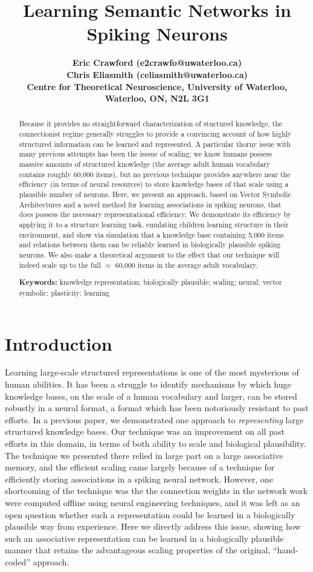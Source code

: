 \documentclass[10pt,letterpaper]{article}
\title{Learning Semantic Networks in Spiking Neurons}
\author{\large \bf Eric Crawford (e2crawfo@uwaterloo.ca)\\
  \large \bf Chris Eliasmith (celiasmith@uwaterloo.ca)\\
  Centre for Theoretical Neuroscience, University of Waterloo,
  Waterloo, ON, N2L 3G1}
\begin{document}

\maketitle

\begin{abstract}
Because it provides no straightforward characterization of stuctured knowledge, the connectionist regime generally struggles to provide a convincing account of how highly structured information can be learned and represented. A particular thorny issue with many previous attempts has been the isssue of scaling; we know humans possess massive amounts of structured knowledge (the average adult human vocabulary contains roughly 60,000 items), but no previous technique provides anywhere near the efficiency (in terms of neural resources) to store knowledge bases of that scale using a plausible number of neurons. Here, we present an approach, based on Vector Symbolic Architectures and a novel method for learning associations in spiking neurons, that does possess the necessary representational efficiency. We demonstrate its efficiency by applying it to a structure learning task, emulating children learning structure in their environment, and show via simulation that a knowledge base containing 5,000 items and relations between them can be reliably learned in biologically plausible spiking neurons. We also make a theoretical argument to the effect that our technique will indeed scale up to the full $\approx$ 60,000 items in the average adult vocabulary.

\textbf{Keywords:} 
knowledge representation; biologically plausible; scaling; neural; vector symbolic; plasticity; learning
\end{abstract}

\section{Introduction}
Learning large-scale structured representations is one of the most mysterious of human abilities. It has been a struggle to identify mechanisms by which huge knowledge bases, on the scale of a human vocabulary and larger, can be stored robustly in a neural format, a format which has been notoriously resistant to past efforts. In a previous paper, we demonstrated one approach to \textit{representing} large structured knowledge bases. Our technique was an improvement on all past efforts in this domain, in terms of both ability to scale and biological plausibility. The technique we presented there relied in large part on a large associative memory, and the efficient scaling came largely because of a technique for efficiently storing associations in a spiking neural network. However, one shortcoming of the technique was the the connection weights in the network work were computed offline using neural engineering techniques, and it was left as an open question whether such a representation could be learned in a biologically plausible way from experience. Here we directly address this issue, showing how such an associative representation can be learned in a biologically plausible manner that retains the advantageous scaling properties of the original, ``hand-coded'' approach.
\end{document}
